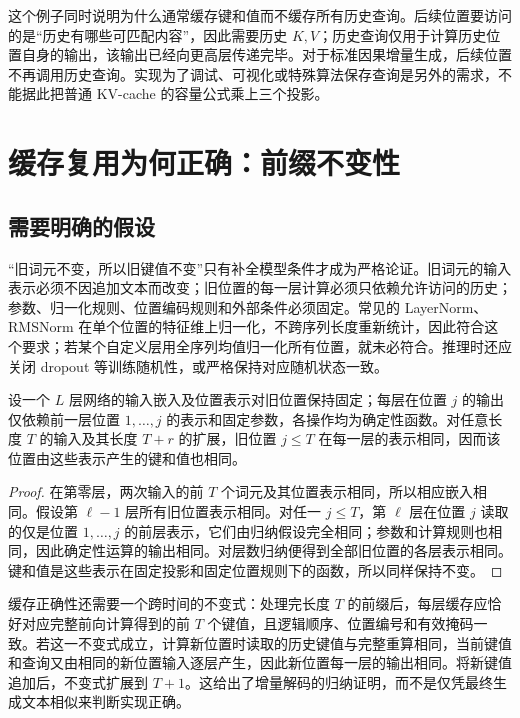 \documentclass[UTF8,12pt,a4paper,fontset=fandol]{ctexart}
\begin{document}
这个例子同时说明为什么通常缓存键和值而不缓存所有历史查询。后续位置要访问的是“历史有哪些可匹配内容”，因此需要历史 $K,V$；历史查询仅用于计算历史位置自身的输出，该输出已经向更高层传递完毕。对于标准因果增量生成，后续位置不再调用历史查询。实现为了调试、可视化或特殊算法保存查询是另外的需求，不能据此把普通 KV-cache 的容量公式乘上三个投影。

\section{缓存复用为何正确：前缀不变性}
\label{sec:kv-correctness}

\subsection{需要明确的假设}

“旧词元不变，所以旧键值不变”只有补全模型条件才成为严格论证。旧词元的输入表示必须不因追加文本而改变；旧位置的每一层计算必须只依赖允许访问的历史；参数、归一化规则、位置编码规则和外部条件必须固定。常见的 LayerNorm、RMSNorm 在单个位置的特征维上归一化，不跨序列长度重新统计，因此符合这个要求；若某个自定义层用全序列均值归一化所有位置，就未必符合。推理时还应关闭 dropout 等训练随机性，或严格保持对应随机状态一致。

\begin{proposition}[前缀不变性]
\label{prop:kv-prefix-invariant}
设一个 $L$ 层网络的输入嵌入及位置表示对旧位置保持固定；每层在位置 $j$ 的输出仅依赖前一层位置 $1,\ldots,j$ 的表示和固定参数，各操作均为确定性函数。对任意长度 $T$ 的输入及其长度 $T+r$ 的扩展，旧位置 $j\leq T$ 在每一层的表示相同，因而该位置由这些表示产生的键和值也相同。
\end{proposition}
\begin{proof}
在第零层，两次输入的前 $T$ 个词元及其位置表示相同，所以相应嵌入相同。假设第 $\ell-1$ 层所有旧位置表示相同。对任一 $j\leq T$，第 $\ell$ 层在位置 $j$ 读取的仅是位置 $1,\ldots,j$ 的前层表示，它们由归纳假设完全相同；参数和计算规则也相同，因此确定性运算的输出相同。对层数归纳便得到全部旧位置的各层表示相同。键和值是这些表示在固定投影和固定位置规则下的函数，所以同样保持不变。
\end{proof}

缓存正确性还需要一个跨时间的不变式：处理完长度 $T$ 的前缀后，每层缓存应恰好对应完整前向计算得到的前 $T$ 个键值，且逻辑顺序、位置编号和有效掩码一致。若这一不变式成立，计算新位置时读取的历史键值与完整重算相同，当前键值和查询又由相同的新位置输入逐层产生，因此新位置每一层的输出相同。将新键值追加后，不变式扩展到 $T+1$。这给出了增量解码的归纳证明，而不是仅凭最终生成文本相似来判断实现正确。
\end{document}
